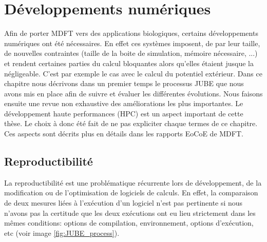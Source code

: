 \chapter{Développements numériques}
\label{chap:numerique}



Afin de porter MDFT vers des applications biologiques, certains développements numériques ont été nécessaires. En effet ces systèmes imposent, de par leur taille, de nouvelles contraintes (taille de la boite de simulation, mémoire nécessaire, ...) et rendent certaines parties du calcul bloquantes alors qu'elles étaient jusque la négligeable. C'est par exemple le cas avec le calcul du potentiel extérieur. Dans ce chapitre nous décrivons dans un premier temps le processus JUBE que nous avons mis en place afin de suivre et évaluer les différentes évolutions. Nous faisons ensuite une revue non exhaustive des améliorations les plus importantes. Le développement haute performances (HPC) est un aspect important de cette thèse. Le choix à donc été fait de ne pas expliciter chaque termes de ce chapitre. Ces aspects sont décrits plus en détails dans les rapports EoCoE de MDFT.


\section{Reproductibilité}
La reproductibilité est une problématique récurrente lors de développement, de la modification ou de l'optimisation de logiciels de calculs. En effet, la comparaison de deux mesures liées à l’exécution d'un logiciel n'est pas pertinente si nous n'avons pas la certitude que les deux exécutions ont eu lieu strictement dans les mêmes conditions: options de compilation, environnement, options d’exécution, etc (voir image \ref{fig:JUBE_process}).

